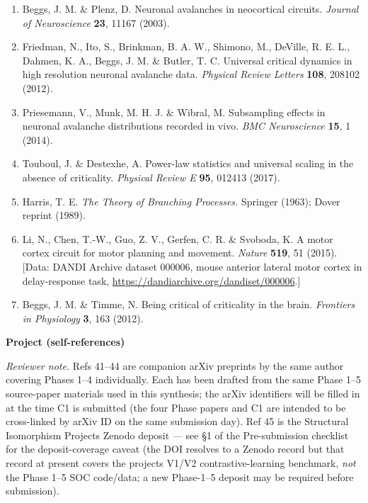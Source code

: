 \documentclass[
  11pt]{article}
\providecommand{\tightlist}{%
  \setlength{\itemsep}{0pt}\setlength{\parskip}{0pt}}
\begin{document}
\begin{enumerate}
\def\labelenumi{\arabic{enumi}.}
\setcounter{enumi}{33}
\tightlist
\item
  Beggs, J. M. \& Plenz, D. Neuronal avalanches in neocortical circuits.
  \emph{Journal of Neuroscience} \textbf{23}, 11167 (2003).
\item
  Friedman, N., Ito, S., Brinkman, B. A. W., Shimono, M., DeVille, R. E.
  L., Dahmen, K. A., Beggs, J. M. \& Butler, T. C. Universal critical
  dynamics in high resolution neuronal avalanche data. \emph{Physical
  Review Letters} \textbf{108}, 208102 (2012).
\item
  Priesemann, V., Munk, M. H. J. \& Wibral, M. Subsampling effects in
  neuronal avalanche distributions recorded in vivo. \emph{BMC
  Neuroscience} \textbf{15}, 1 (2014).
\item
  Touboul, J. \& Destexhe, A. Power-law statistics and universal scaling
  in the absence of criticality. \emph{Physical Review E} \textbf{95},
  012413 (2017).
\item
  Harris, T. E. \emph{The Theory of Branching Processes.} Springer
  (1963); Dover reprint (1989).
\item
  Li, N., Chen, T.-W., Guo, Z. V., Gerfen, C. R. \& Svoboda, K. A motor
  cortex circuit for motor planning and movement. \emph{Nature}
  \textbf{519}, 51 (2015). {[}Data: DANDI Archive dataset 000006, mouse
  anterior lateral motor cortex in delay-response task,
  \url{https://dandiarchive.org/dandiset/000006}.{]}
\item
  Beggs, J. M. \& Timme, N. Being critical of criticality in the brain.
  \emph{Frontiers in Physiology} \textbf{3}, 163 (2012).
\end{enumerate}

\textbf{Project (self-references)}

\emph{Reviewer note.} Refs 41--44 are companion arXiv preprints by the
same author covering Phases 1--4 individually. Each has been drafted
from the same Phase 1--5 source-paper materials used in this synthesis;
the arXiv identifiers will be filled in at the time C1 is submitted (the
four Phase papers and C1 are intended to be cross-linked by arXiv ID on
the same submission day). Ref 45 is the Structural Isomorphism
Project\textquotesingle s Zenodo deposit --- see §1 of the
Pre-submission checklist for the deposit-coverage caveat (the DOI
resolves to a Zenodo record but that record at present covers the
project\textquotesingle s V1/V2 contrastive-learning benchmark,
\emph{not} the Phase 1--5 SOC code/data; a new Phase-1--5 deposit may be
required before submission).
\end{document}
